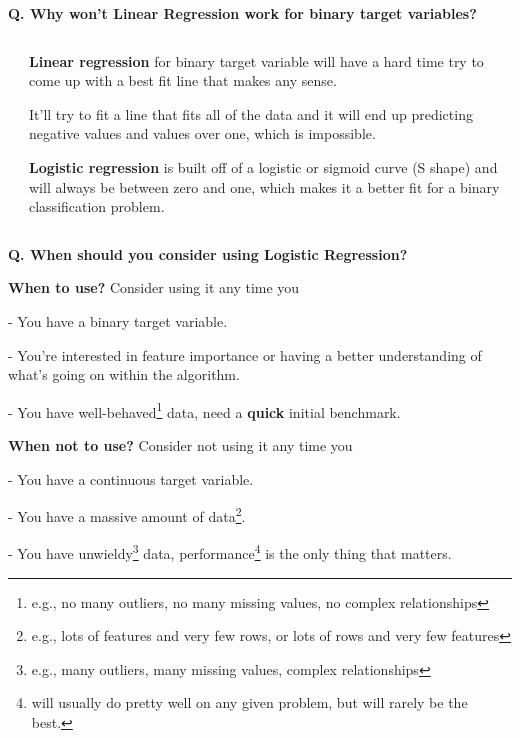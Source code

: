 \begin{frame}[fragile]{\textbf{Q. Why won't Linear Regression work for binary target variables?}}
\begin{columns}[T]
\begin{column}{.58\textwidth}
{{      }
    }
  \end{column}
  \hfill
  \begin{column}{.4\textwidth}
    \footnotesize
    \begin{wideitemize}
    \item<1-> \textbf{Linear regression} for binary target variable will have a
      hard time try to come up with a best fit line that makes any sense.
    \item<2-> It'll try to fit a line that fits all of the data and it will end
      up predicting negative values and values over one, which is impossible.
    \item<3-> \textbf{Logistic regression} is built off of a logistic or sigmoid
      curve (S shape) and will always be between zero and one, which makes it a
      better fit for a binary classification problem.
    \end{wideitemize}
    \end{column}
  \end{columns}
\end{frame}


\begin{frame}[fragile]{\textbf{Q. When should you consider using Logistic Regression?}}
  \begin{wideitemize}
  \item \textbf{When to use?} Consider using it any time you
  \begin{wideitemize}\setlength{\itemsep}{0.6em}
  \item[-] You have a binary target variable.
  \item[-] You're interested in feature importance or having a better understanding
  of what's going on within the algorithm.
  \item[-] You have well-behaved\footnote{e.g., no many outliers, no many missing
  values, no complex relationships} data, need a \textbf{quick} initial benchmark.
  \end{wideitemize}
  \item \textbf{When not to use?} Consider not using it any time you
  \begin{wideitemize}\setlength{\itemsep}{0.6em}
  \item[-] You have a continuous target variable.
  \item[-] You have a massive amount of data\footnote{e.g., lots of features and
  very few rows, or lots of rows and very few features}.
  \item[-] You have unwieldy\footnote{e.g., many outliers, many missing
  values, complex relationships} data, performance\footnote{will usually do pretty
  well on any given problem, but will rarely be the best.} is the only thing that matters.
  \end{wideitemize}
  \end{wideitemize}
\end{frame}

